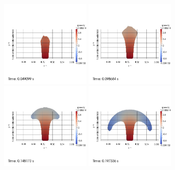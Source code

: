 \begin{figure}
\begin{center}
\subcaptionbox{\label{top:jet:Py:1}}
{
\includegraphics[width=0.4\textwidth]{topology/JetPetit/speedy0000.jpg}
}
\subcaptionbox{\label{top:jet:Py:2}}
{
\includegraphics[width=0.4\textwidth]{topology/JetPetit/speedy0001.jpg}
}
\subcaptionbox{\label{top:jet:Py:3}}
{
\includegraphics[width=0.4\textwidth]{topology/JetPetit/speedy0002.jpg}
}
\subcaptionbox{\label{top:jet:Py:4}}
{
\includegraphics[width=0.4\textwidth]{topology/JetPetit/speedy0003.jpg}
}
\end{center}
\end{figure}

